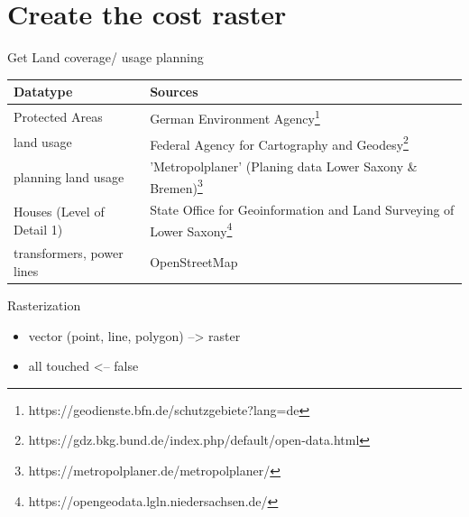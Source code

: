 \documentclass[usenames,dvipsnames,aspectratio=169]{beamer}
\begin{document}
\section{Create the cost raster}
\begin{frame}{Get Land coverage/ usage planning}
	
	\begin{tabular}{ l  p{75mm} }
		Datatype & Sources\\
		\hline 
		Protected Areas 	& German Environment Agency\footnote{https://geodienste.bfn.de/schutzgebiete?lang=de}\\
		land usage & Federal Agency for Cartography and Geodesy\footnote{https://gdz.bkg.bund.de/index.php/default/open-data.html} \\
		planning land usage & 'Metropolplaner' (Planing data Lower Saxony \& Bremen)\footnote{https://metropolplaner.de/metropolplaner/}\\
		Houses (Level of Detail 1) &State Office for Geoinformation and \newline Land Surveying of Lower Saxony\footnote{https://opengeodata.lgln.niedersachsen.de/}\\
		transformers, power lines  & OpenStreetMap\\
	\end{tabular}
\end{frame}


\begin{frame}{Rasterization}
	\begin{itemize}
		\item vector (point, line, polygon) --> raster
		\item all touched <-- false
	\end{itemize}
	\vspace{5.0mm}
\end{frame}
\end{document}
